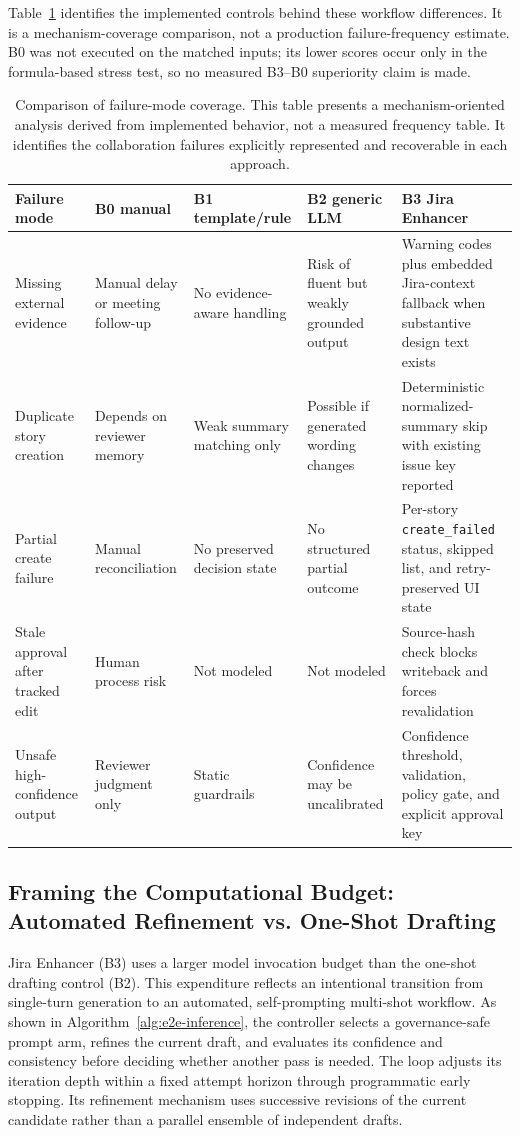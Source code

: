\documentclass[pdflatex,sn-basic]{sn-jnl}
\begin{document}
Table~\ref{tab:failure-mode-coverage} identifies the implemented controls behind these workflow differences. It is a mechanism-coverage comparison, not a production failure-frequency estimate. B0 was not executed on the matched inputs; its lower scores occur only in the formula-based stress test, so no measured B3--B0 superiority claim is made.

\begin{table}
\centering
\setlength{\tabcolsep}{4pt}
\small
\caption{Comparison of failure-mode coverage. This table presents a mechanism-oriented analysis derived from implemented behavior, not a measured frequency table. It identifies the collaboration failures explicitly represented and recoverable in each approach.}
\label{tab:failure-mode-coverage}
\begin{tabularx}{\textheight}{@{}p{0.22\textheight}p{0.18\textheight}p{0.18\textheight}p{0.18\textheight}X@{}}
\toprule
Failure mode & B0 manual & B1 template/rule & B2 generic LLM & B3 Jira Enhancer \\
\midrule
Missing external evidence & Manual delay or meeting follow-up & No evidence-aware handling & Risk of fluent but weakly grounded output & Warning codes plus embedded Jira-context fallback when substantive design text exists \\
Duplicate story creation & Depends on reviewer memory & Weak summary matching only & Possible if generated wording changes & Deterministic normalized-summary skip with existing issue key reported \\
Partial create failure & Manual reconciliation & No preserved decision state & No structured partial outcome & Per-story \texttt{create\_failed} status, skipped list, and retry-preserved UI state \\
Stale approval after tracked edit & Human process risk & Not modeled & Not modeled & Source-hash check blocks writeback and forces revalidation \\
Unsafe high-confidence output & Reviewer judgment only & Static guardrails & Confidence may be uncalibrated & Confidence threshold, validation, policy gate, and explicit approval key \\
\bottomrule
\end{tabularx}
\end{table}

\subsection{Framing the Computational Budget: Automated Refinement vs. One-Shot Drafting}
Jira Enhancer (B3) uses a larger model invocation budget than the one-shot drafting control (B2). This expenditure reflects an intentional transition from single-turn generation to an automated, self-prompting multi-shot workflow. As shown in Algorithm~\ref{alg:e2e-inference}, the controller selects a governance-safe prompt arm, refines the current draft, and evaluates its confidence and consistency before deciding whether another pass is needed. The loop adjusts its iteration depth within a fixed attempt horizon through programmatic early stopping. Its refinement mechanism uses successive revisions of the current candidate rather than a parallel ensemble of independent drafts.
\end{document}
